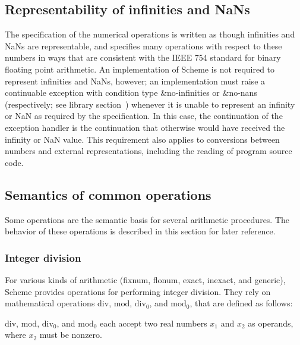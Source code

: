 \subsection{Representability of infinities and NaNs}
\label{infinitiesnanssection}

The specification of the numerical operations is written as though
infinities and NaNs are representable, and specifies many operations
with respect to these numbers in ways that are consistent with the
IEEE 754 standard for binary floating point arithmetic.  
An implementation of Scheme is not required to represent infinities and
NaNs, however;
an implementation must raise a continuable exception with
condition type {\cf\&no-infinities} or {\cf\&no-nans} (respectively;
see library section~)
whenever it is unable to represent an infinity or NaN as required by
the specification.  In this case, the continuation of the exception
handler is the continuation that otherwise would have received
the infinity or NaN value.  This requirement also applies to
conversions between numbers and external representations, including
the reading of program source code.

\subsection{Semantics of common operations}

Some operations are the semantic basis for several arithmetic
procedures.  The behavior of these operations is described in this
section for later reference.

\subsubsection{Integer division}
\label{integerdivision}

For various kinds of arithmetic (fixnum, flonum, exact, inexact, and
generic), Scheme provides operations for performing integer
division.  They rely on mathematical operations $\mathrm{div}$,
$\mathrm{mod}$, $\mathrm{div}_0$, and
$\mathrm{mod}_0$, that are defined as follows:

$\mathrm{div}$, $\mathrm{mod}$, $\mathrm{div}_0$, and $\mathrm{mod}_0$
each accept two real numbers $x_1$ and $x_2$ as operands, where
$x_2$ must be nonzero.

